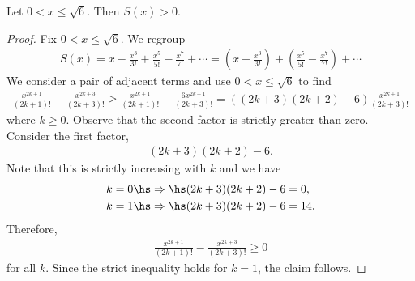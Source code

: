\documentclass{article}
\begin{document}
\begin{claim*}
   Let $0<x\leq \sqrt{6}$. Then $S(x)>0$. 
\end{claim*}
\begin{proof}
   Fix $0<x\leq\sqrt{6}$. We regroup 
   \begin{align*}
      S(x) = x - \frac{x^3}{3!} + \frac{x^5}{5!} - \frac{x^7}{7!} + \cdots
      = \left(x - \frac{x^3}{3!}\right) + \left(\frac{x^5}{5!} - \frac{x^7}{7!}\right) + \cdots
   \end{align*}
   We consider a pair of adjacent terms and use $0<x\leq\sqrt{6}$ to find 
   \begin{align*}
      \frac{x^{2k+1}}{(2k+1)!} - \frac{x^{2k+3}}{(2k+3)!}
      \geq \frac{x^{2k+1}}{(2k+1)!}-\frac{6x^{2k+1}}{(2k+3)!}
      = ((2k+3)(2k+2)-6)\frac{x^{2k+1}}{(2k+3)!}
   \end{align*}
   where $k\geq 0$.
   Observe that the second factor is strictly greater than zero. Consider the first factor,
   \begin{align*}
      (2k+3)(2k+2) - 6.
   \end{align*}
   Note that this is strictly increasing with $k$ and we have 
   \begin{align*}
      k=0 \hs&\Rightarrow\hs (2k+3)(2k+2) - 6 = 0,\\ 
      k=1 \hs&\Rightarrow\hs (2k+3)(2k+2) - 6 = 14.\\ 
   \end{align*}
   Therefore, 
   \begin{align*}
      \frac{x^{2k+1}}{(2k+1)!} - \frac{x^{2k+3}}{(2k+3)!} \geq 0
   \end{align*}
   for all $k$. Since the strict inequality holds for $k=1$, the claim follows.
\end{proof}
\end{document}

